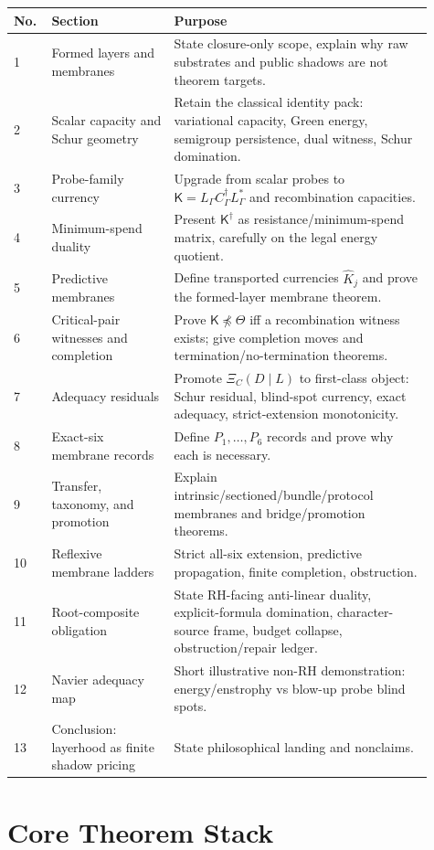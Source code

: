 \documentclass[11pt]{article}
\newcommand{\K}{\mathsf K}
\begin{document}
\begin{longtable}{p{0.06\linewidth}p{0.27\linewidth}p{0.58\linewidth}}
\toprule
No. & Section & Purpose \\
\midrule
1 & Formed layers and membranes & State closure-only scope, explain why raw substrates and public shadows are not theorem targets. \\
2 & Scalar capacity and Schur geometry & Retain the classical identity pack: variational capacity, Green energy, semigroup persistence, dual witness, Schur domination. \\
3 & Probe-family currency & Upgrade from scalar probes to $\K=L_\Gamma C_\Gamma^\dagger L_\Gamma^*$ and recombination capacities. \\
4 & Minimum-spend duality & Present $\K^\dagger$ as resistance/minimum-spend matrix, carefully on the legal energy quotient. \\
5 & Predictive membranes & Define transported currencies $\widehat K_j$ and prove the formed-layer membrane theorem. \\
6 & Critical-pair witnesses and completion & Prove $\K\npreceq\Theta$ iff a recombination witness exists; give completion moves and termination/no-termination theorems. \\
7 & Adequacy residuals & Promote $\Xi_C(D\mid L)$ to first-class object: Schur residual, blind-spot currency, exact adequacy, strict-extension monotonicity. \\
8 & Exact-six membrane records & Define $P_1,\ldots,P_6$ records and prove why each is necessary. \\
9 & Transfer, taxonomy, and promotion & Explain intrinsic/sectioned/bundle/protocol membranes and bridge/promotion theorems. \\
10 & Reflexive membrane ladders & Strict all-six extension, predictive propagation, finite completion, obstruction. \\
11 & Root-composite obligation & State RH-facing anti-linear duality, explicit-formula domination, character-source frame, budget collapse, obstruction/repair ledger. \\
12 & Navier adequacy map & Short illustrative non-RH demonstration: energy/enstrophy vs blow-up probe blind spots. \\
13 & Conclusion: layerhood as finite shadow pricing & State philosophical landing and nonclaims. \\
\bottomrule
\end{longtable}

\section{Core Theorem Stack}
\end{document}
